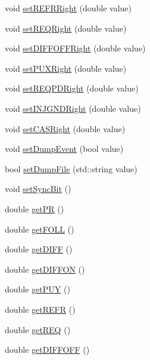 \begin{DoxyCompactItemize}
\item 
void \hyperlink{classdevice2yarp_a026af71fd22a53e87896a1b1e5fbe2d9}{set\+R\+E\+F\+R\+Right} (double value)
\item 
void \hyperlink{classdevice2yarp_acb5c45d2835c3ea311f81daf2f4545cd}{set\+R\+E\+Q\+Right} (double value)
\item 
void \hyperlink{classdevice2yarp_a5a62082f903ae997ee15f3616c332635}{set\+D\+I\+F\+F\+O\+F\+F\+Right} (double value)
\item 
void \hyperlink{classdevice2yarp_a86ac1223c0a74dacebc26597e1a16ae9}{set\+P\+U\+X\+Right} (double value)
\item 
void \hyperlink{classdevice2yarp_aaac082c96f859df902389e60be83c328}{set\+R\+E\+Q\+P\+D\+Right} (double value)
\item 
void \hyperlink{classdevice2yarp_afab1c11e9c891a5b2103afa5d6101374}{set\+I\+N\+J\+G\+N\+D\+Right} (double value)
\item 
void \hyperlink{classdevice2yarp_aaa3573b8c4bb7e0348c97b87ef8edcd2}{set\+C\+A\+S\+Right} (double value)
\item 
void \hyperlink{classdevice2yarp_a4ef67bab52a9bbee2c590960afffc2e3}{set\+Dump\+Event} (bool value)
\item 
bool \hyperlink{classdevice2yarp_ac53bd1cc581717e681ad3ea0962db697}{set\+Dump\+File} (std\+::string value)
\item 
void \hyperlink{classdevice2yarp_ad5c9adf0e41f78d38a1d1b9265011dfa}{set\+Sync\+Bit} ()
\item 
double \hyperlink{classdevice2yarp_a85742caba0c13dbec757e034419ac570}{get\+PR} ()
\item 
double \hyperlink{classdevice2yarp_a45256821729711ac676b98fd86a2934b}{get\+F\+O\+LL} ()
\item 
double \hyperlink{classdevice2yarp_ac49ff696fd4ca634fb00188c7f84d5e0}{get\+D\+I\+FF} ()
\item 
double \hyperlink{classdevice2yarp_ae82c9cacfc6df370b144f764e1ba2d71}{get\+D\+I\+F\+F\+ON} ()
\item 
double \hyperlink{classdevice2yarp_a35e0c7313c78f7d4cfe7403b20742be7}{get\+P\+UY} ()
\item 
double \hyperlink{classdevice2yarp_a0cfbc83863780cb22777ea0df0dff4bb}{get\+R\+E\+FR} ()
\item 
double \hyperlink{classdevice2yarp_a02f8aaa21afea5a2c3cf690d4a7a810a}{get\+R\+EQ} ()
\item 
double \hyperlink{classdevice2yarp_aebb49f54bbbd1f89767ebc7473cf27f8}{get\+D\+I\+F\+F\+O\+FF} ()

\end{DoxyCompactItemize}
